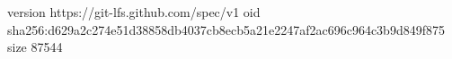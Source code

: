 version https://git-lfs.github.com/spec/v1
oid sha256:d629a2c274e51d38858db4037cb8ecb5a21e2247af2ac696c964c3b9d849f875
size 87544
